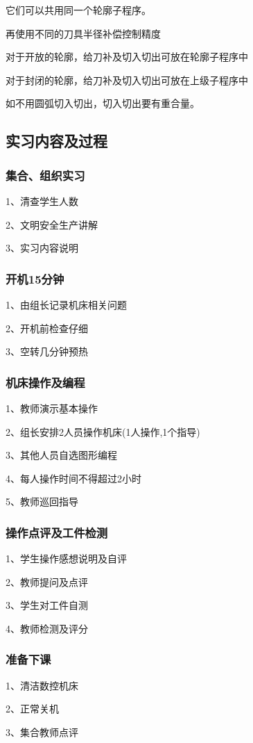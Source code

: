 它们可以共用同一个轮廓子程序。

再使用不同的刀具半径补偿控制精度

对于开放的轮廓，给刀补及切入切出可放在轮廓子程序中

对于封闭的轮廓，给刀补及切入切出可放在上级子程序中

如不用圆弧切入切出，切入切出要有重合量。


\subsection{实习内容及过程}

\subsubsection{集合、组织实习}
1、清查学生人数

2、文明安全生产讲解

3、实习内容说明
\subsubsection{开机15分钟}
1、由组长记录机床相关问题

2、开机前检查仔细

3、空转几分钟预热
\subsubsection{机床操作及编程}
1、教师演示基本操作

2、组长安排2人员操作机床(1人操作,1个指导)

3、其他人员自选图形编程

4、每人操作时间不得超过2小时

5、教师巡回指导
\subsubsection{操作点评及工件检测}
1、学生操作感想说明及自评

2、教师提问及点评

3、学生对工件自测

4、教师检测及评分
\subsubsection{准备下课}
1、清洁数控机床

2、正常关机

3、集合教师点评

